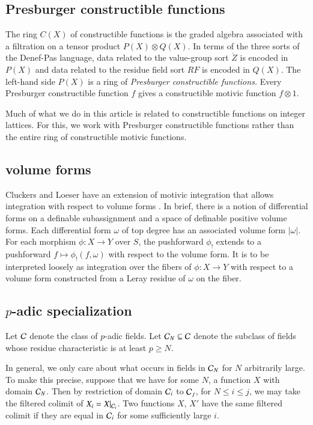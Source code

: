 \subsection{Presburger constructible functions}

The ring $C(X)$ of constructible functions is 
the graded algebra associated with a filtration on a tensor product $P(X) \otimes
Q(X)$.   In terms of the
three sorts of the Denef-Pas language, data related to the value-group
sort $\ring{Z}$ is encoded in $P(X)$ and data related to the residue
field sort $RF$ is encoded in $Q(X)$.  The left-hand side $P(X)$ is a
ring of {\it Presburger constructible functions.}  Every Presburger
constructible function $f$ gives a constructible motivic function
$f\otimes 1$.

Much of what we do in this article is related to constructible
functions on integer lattices.  For this, we work with Presburger
constructible functions rather than the entire ring of constructible
motivic functions.

\subsection{volume forms}

Cluckers and Loeser have an extension of motivic integration that
allows integration with respect to volume forms
\cite[\S8]{cluckers2008constructible}.  In brief, there is a notion of
differential forms on a definable subassignment and a space of
definable positive volume forms.  Each differential form $\omega$ of
top degree has an associated volume form $|\omega|$.  For each
morphism $\phi:X\to Y$ over $S$, the pushforward $\phi_!$ extends to a
pushforward $f \mapsto \phi_!(f,\omega)$ with respect to the volume
form.  It is to be interpreted loosely as integration over the fibers
of $\phi:X\to Y$ with respect to a volume form constructed from a
Leray residue of $\omega$ on the fiber.

\subsection{$p$-adic specialization}

Let $\mathcal C$ denote the class of $p$-adic fields.  Let $\mathcal C_N\subseteq \mathcal C$
denote the subclass of fields whose residue characteristic is at least
$p\ge N$.

In general, we only care about what occurs in fields in $\mathcal C_N$ for $N$
arbitrarily large.  To make this precise, suppose that we have for
some $N$, a function $X$ with domain $\mathcal C_N$.  Then by restriction of
domain $\mathcal C_i$ to $\mathcal C_{j}$, for $N\le i\le j$, we may take the filtered
colimit of $X_i=X|_{\mathcal C_i}$.  Two functions $X$, $X'$ have the same
filtered colimit if they are equal in $\mathcal C_i$ for some sufficiently
large $i$.

